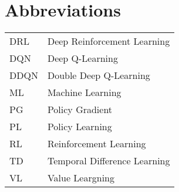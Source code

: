 
\section*{Abbreviations}
\begin{tabular}{l l}
    \label{tab:table}
    DRL     & Deep Reinforcement Learning\\
    DQN     & Deep Q-Learning\\
    DDQN    & Double Deep Q-Learning\\
    ML      & Machine Learning\\
    PG      & Policy Gradient\\
    PL      & Policy Learning\\
    RL      & Reinforcement Learning\\
    TD      & Temporal Difference Learning\\
    VL      & Value Leargning\\
\end{tabular}